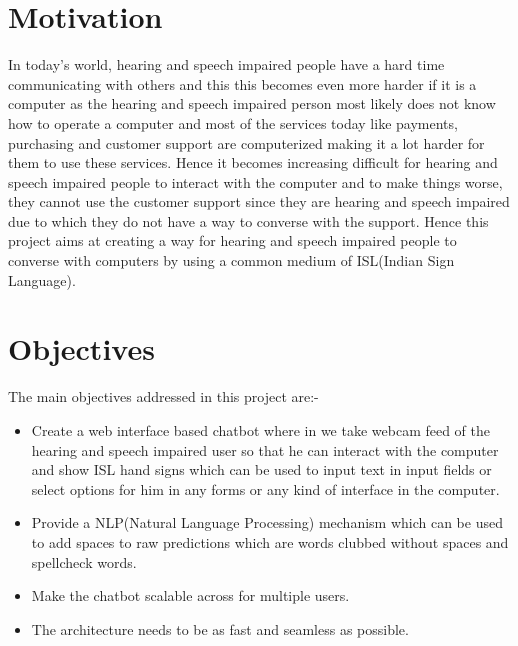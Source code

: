\documentclass[12pt,a4paper]{report}
\begin{document}
\section{Motivation}
In today's world, hearing and speech impaired people have a hard time communicating with others and this this becomes even more harder if it is a computer as the hearing and speech impaired person most likely does not know how to operate a computer and most of the services today like payments, purchasing and customer support are computerized making it a lot harder for them to use these services. Hence it becomes increasing difficult for hearing and speech impaired people to interact with the computer and to make things worse, they cannot use the customer support since they are hearing and speech impaired due to which they do not have a way to converse with the support. Hence this project aims at creating a way for hearing and speech impaired people to converse with computers by using a common medium of ISL(Indian Sign Language).

\section{Objectives}
The main objectives addressed in this project are:-
\begin{itemize}
	\item Create a web interface based chatbot where in we take webcam feed of the hearing and speech impaired user so that he can interact with the computer and show ISL hand signs which can be used to input text in input fields or select options for him in any forms or any kind of interface in the computer.
	\item Provide a NLP(Natural Language Processing) mechanism which can be used to add spaces to raw predictions which are words clubbed without spaces and spellcheck words.
	\item Make the chatbot scalable across for multiple users.
	\item The architecture needs to be as fast and seamless as possible.
\end{itemize}
\end{document}
